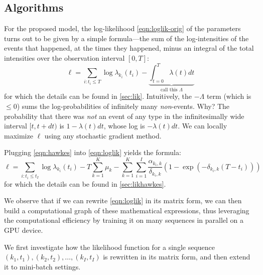 \documentclass{article}
\begin{document}
\subsection{Algorithms}
\label{sec:algo}

For the proposed model,
the log-likelihood \eqref{eqn:loglik-orig} of the parameters turns out to be given by a simple formula---the sum of the log-intensities of the events that happened, at the times they happened, minus an integral of the total intensities over the observation interval $[0,T]$:
\begin{equation}\label{eqn:loglik}
    {\ell} = \sum_{i: t_i \leq T} \log \lambda_{k_i}(t_i) - \underbrace{\int_{t=0}^{T} \lambda(t) dt}_{\text{call this }\Lambda}
\end{equation}
for which the details can be found in \cref{sec:lik}.
Intuitively, the $-\Lambda$ term (which is $\leq 0$) sums the log-probabilities of infinitely many {\em non}-events.  Why?  The probability that there was {\em not} an event of any type in the infinitesimally wide interval $[t,t+dt)$ is $1-\lambda(t)dt$, whose log is $-\lambda(t) dt$.
We can locally maximize ${\ell}$ using any stochastic gradient method. 

Plugging \cref{eqn:hawkes} into \cref{eqn:loglik} yields the formula:
\begin{equation}\label{eqn:loglik-full}
    {\ell} = \sum_{i: t_i \leq t_I} \log \lambda_{k_i}(t_i) -  T \sum_{k=1}^{K} \mu_k - \sum_{k=1}^{K} \sum_{i=1}^{I} \frac{\alpha_{k_i,k}}{\delta_{k_i,k}} ( 1 - \exp(-\delta_{k_i,k}(T-t_i)) )
\end{equation}
for which the details can be found in \cref{sec:likhawkes}.

We observe that if we can rewrite \cref{eqn:loglik} in its matrix form, we can then build a computational graph of these mathematical expressions, thus leveraging the computational efficiency by training it on many sequences in parallel on a GPU device. 

We first investigate how the likelihood function for a single sequence $(k_1,t_1), (k_2, t_2), \ldots, (k_I,t_I)$ is rewritten in its matrix form, and then extend it to mini-batch settings. 
\end{document}

